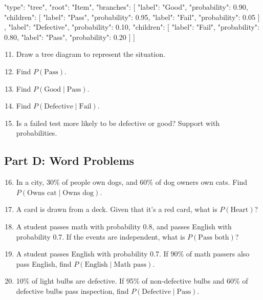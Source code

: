 \documentclass[14pt]{extarticle}
\begin{document}
\begin{diagramdata}
{
  "type": "tree",
  "root": "Item",
  "branches": [
    {
      "label": "Good",
      "probability": 0.90,
      "children": [
        {"label": "Pass", "probability": 0.95},
        {"label": "Fail", "probability": 0.05}
      ]
    },
    {
      "label": "Defective",
      "probability": 0.10,
      "children": [
        {"label": "Fail", "probability": 0.80},
        {"label": "Pass", "probability": 0.20}
      ]
    }
  ]
}
\end{diagramdata}

\begin{enumerate}
  \setcounter{enumi}{10}
  \item Draw a tree diagram to represent the situation. \DiagramAfterReveal
  \item Find \(P(\text{Pass})\).
  \item Find \(P(\text{Good}\mid \text{Pass})\).
  \item Find \(P(\text{Defective}\mid \text{Fail})\).
  \item Is a failed test more likely to be defective or good? Support with probabilities.
\end{enumerate}

\subsection*{Part D: Word Problems}
\begin{enumerate}
  \setcounter{enumi}{15}
  \item In a city, 30\% of people own dogs, and 60\% of dog owners own cats. Find \(P(\text{Owns cat}\mid \text{Owns dog})\).
  \item A card is drawn from a deck. Given that it’s a red card, what is \(P(\text{Heart})\)?
  \item A student passes math with probability 0.8, and passes English with probability 0.7. If the events are independent, what is \(P(\text{Pass both})\)?
  \item A student passes English with probability 0.7. If 90\% of math passers also pass English, find \(P(\text{English}\mid \text{Math pass})\).
  \item 10\% of light bulbs are defective. If 95\% of non-defective bulbs and 60\% of defective bulbs pass inspection, find \(P(\text{Defective}\mid \text{Pass})\).
\end{enumerate}
\end{document}

